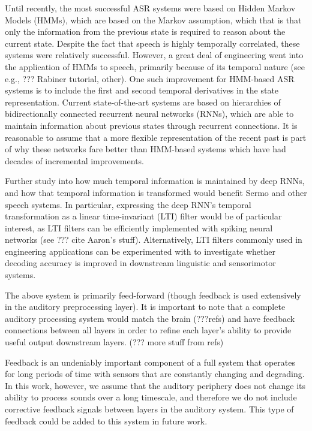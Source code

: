Until recently,
the most successful ASR systems
were based on Hidden Markov Models (HMMs),
which are based on the Markov assumption,
which that is that only the information
from the previous state is required
to reason about the current state.
Despite the fact that speech is highly temporally correlated,
these systems were relatively successful.
However, a great deal of engineering
went into the application of HMMs
to speech, primarily because of
its temporal nature
(see e.g., ??? Rabiner tutorial,
other).
One such improvement for HMM-based ASR systems
is to include the first and second temporal derivatives
in the state representation.
Current state-of-the-art systems
are based on hierarchies of bidirectionally connected
recurrent neural networks (RNNs),
which are able to maintain information about
previous states through recurrent connections.
It is reasonable to assume that
a more flexible representation
of the recent past
is part of why these networks
fare better than HMM-based systems
which have had decades of incremental improvements.

Further study into how much temporal information
is maintained by deep RNNs,
and how that temporal information is transformed
would benefit Sermo
and other speech systems.
In particular, expressing the deep RNN's
temporal transformation as a
linear time-invariant (LTI) filter
would be of particular interest,
as LTI filters can be efficiently implemented
with spiking neural networks
(see ??? cite Aaron's stuff).
Alternatively, LTI filters
commonly used in engineering applications
can be experimented with
to investigate whether decoding accuracy
is improved in downstream
linguistic and sensorimotor systems.

The above system is primarily feed-forward
(though feedback is used extensively in the
auditory preprocessing layer).
It is important to note that
a complete auditory processing system
would match the brain (???refs) and have
feedback connections between all layers
in order to refine each layer's ability
to provide useful output downstream layers.
(??? more stuff from refs)

Feedback is an undeniably important
component of a full system that operates
for long periods of time with sensors
that are constantly changing and degrading.
In this work, however, we assume
that the auditory periphery does not change
its ability to process sounds over a long timescale,
and therefore we do not include corrective feedback
signals between layers in the auditory system.
This type of feedback could be added
to this system in future work.

